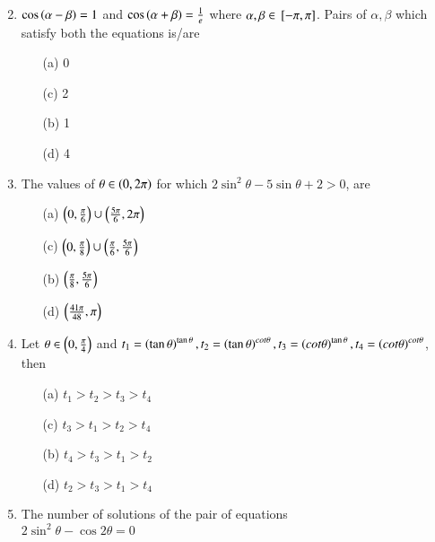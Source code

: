 \documentclass[journal,12pt,twocolumn,article]{IEEEtran}
\theoremstyle{remark}
\begin{document}
\begin{enumerate}[start = 20]
\begin{multicols}{2}
\begin{enumerate}
\end{enumerate}
\end{multicols}
\item $\cos\left(\alpha - \beta\right)=1$ and $\cos\left(\alpha + \beta\right)=\frac{1}{e}$ where $\alpha, \beta \in {}\left[-\pi,\pi\right]$. Pairs of $\alpha, \beta$ which satisfy both the equations is/are
\hfill{}
\begin{multicols}{2}
\begin{enumerate}
\item[(a)] 0
\item[(c)] 2
\columnbreak
\item[(b)] 1
\item[(d)] 4 
\end{enumerate}
\end{multicols}
\item The values of $\theta \in \left(0,2\pi\right)$ for which $2\sin^2\theta - 5\sin\theta + 2 > 0$, are
\hfill{}
\begin{multicols}{2}
\begin{enumerate}
\item[(a)] $\left(0,\frac{\pi}{6}\right)\cup\left(\frac{5\pi}{6},2\pi\right)$
\item[(c)] $\left(0,\frac{\pi}{8}\right)\cup\left(\frac{\pi}{6},\frac{5\pi}{6}\right)$
\columnbreak
\item[(b)] $\left(\frac{\pi}{8},\frac{5\pi}{6}\right)$
\item[(d)] $\left(\frac{41\pi}{48},\pi\right)$
\end{enumerate}
\end{multicols}
\item Let $\theta \in \left(0,\frac{\pi}{4}\right)$ and $t_1 = \left(\tan\theta\right)^{\tan\theta}, t_2 = \left(\tan\theta\right)^{cot\theta},t_3 = \left(cot\theta\right)^{\tan\theta}, t_4 = \left(cot\theta\right)^{cot\theta}$, then
\hfill{}
\begin{multicols}{2}
\begin{enumerate}
\item[(a)] $t_1>t_2>t_3>t_4$
\item[(c)] $t_3>t_1>t_2>t_4$
\columnbreak
\item[(b)] $t_4>t_3>t_1>t_2$
\item[(d)] $t_2>t_3>t_1>t_4$
\end{enumerate}
\end{multicols}
\item The number of solutions of the pair of equations\\
$2\sin^2\theta - \cos2\theta = 0$\\

\end{enumerate}
\end{document}
